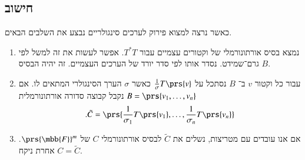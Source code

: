 \documentclass[a4paper,10pt,oneside,openany]{article}
\begin{document}
\subsection{חישוב}

\begin{algorithm}
כאשר נרצה למצוא פירוק לערכים סינגולריים נבצע את השלבים הבאים.

\begin{enumerate}
\item נמצא בסיס אורתונורמלי של וקטורים עצמיים עבור
$T^* T$. אפשר לעשות את זה למשל לפי גרם־שמידט.
נסדר אותו לפי סדר יורד של הערכים העצמיים.
זה יהיה הבסיס
$B$.

\item עבור כל וקטור
$v$
ב־%
$B$
נסתכל על
$\frac{1}{\sigma} T\prs{v}$
כאשר
$\sigma$
הערך הסינגולרי המתאים לו.
אם
$B = \prs{v_1, \ldots, v_n}$
נקבל קבוצה סדורה אורתונורמלית
\[\text{.} \tilde{C} = \prs{\frac{1}{\sigma_1} T\prs{v_1}, \ldots, \frac{1}{\sigma_n} T\prs{v_n}}\]

\item אם אנו עובדים עם מטריצות, נשלים את
$\tilde{C}$
לבסיס אורתונורמלי
$C$
של
$\prs{\mbb{F}}^m$.
אחרת ניקח
$C = \tilde{C}$.
\end{enumerate}
\end{algorithm}
\end{document}
